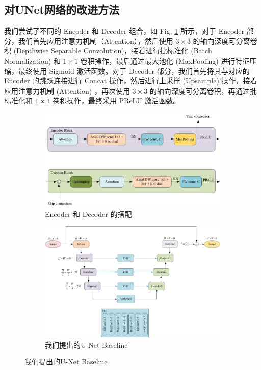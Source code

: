 \documentclass[a4paper]{ctexart}
\begin{document}
		
		\subsection*{对UNet网络的改进方法}
		
		我们尝试了不同的 Encoder 和 Decoder 组合，如 Fig. \ref{fig: Encoder and Decoder} 所示，对于 Encoder 部分，我们首先应用注意力机制（Attention），然后使用 $3 \times 3$ 的轴向深度可分离卷积 (Depthwise Separable Convolution)，接着进行批标准化 (Batch Normalization) 和 $1 \times 1$ 卷积操作，最后通过最大池化 (MaxPooling) 进行特征压缩，最终使用 Sigmoid 激活函数。对于 Decoder 部分，我们首先将其与对应的 Encoder 的跳跃连接进行 Concat 操作，然后进行上采样 (Upsample) 操作，接着应用注意力机制 (Attention) ，再次使用 $3 \times 3$ 的轴向深度可分离卷积，再通过批标准化和 $1 \times 1$ 卷积操作，最终采用 PReLU 激活函数。
		
		\begin{figure}[htbp]
			\centering
			\begin{subfigure}{0.8\textwidth}
				\includegraphics[width=\linewidth]{picture/LLIE/Experiment/Encoder and Decoder}
				\captionsetup{font=scriptsize}
				\caption{Encoder 和 Decoder 的搭配}
				\label{fig: Encoder and Decoder}
			\end{subfigure}
			\begin{subfigure}{0.8\textwidth}
				\includegraphics[width=\linewidth]{picture/LLIE/Experiment/Baseline}
				\captionsetup{font=scriptsize}
				\caption{我们提出的U-Net Baseline}
				\label{fig: Baseline}
			\end{subfigure}
		\end{figure}
		
\end{document}
